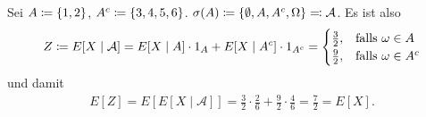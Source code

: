 \documentclass[a4paper,twoside,DIV15,BCOR12mm]{scrbook}
\newcommand{\cA}{\mathcal A}
\begin{document}
\begin{beispiel}
Sei $A\da \{1,2\}$, $A^c \da \{3,4,5,6\}$. $\sigma(A)\da \{\emptyset,A,A^c,\Omega\} \ad \cA$. Es ist also
\begin{align*}
Z \da E[X\mid \cA] = E[X\mid A] \cdot 1_A + E[X\mid A^c]\cdot 1_{A^c} =
\begin{cases}
\frac 32, & \text{falls $\omega\in A$} \\
\frac 92, & \text{falls $\omega\in A^c$} 
\end{cases}
\end{align*}
und damit
\begin{align*}
E[Z] = E[ E[X\mid \cA] ] = \frac32 \cdot \frac 26 + \frac 92 \cdot \frac 46 = \frac 72 = E[X].
\end{align*}
\end{beispiel}
\end{document}
